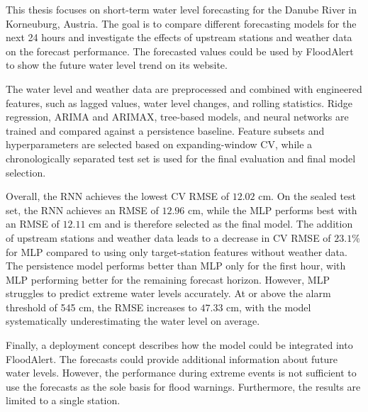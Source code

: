 This thesis focuses on short-term water level forecasting for the Danube River in Korneuburg, Austria. The goal is to compare different forecasting models for the next 24 hours and investigate the effects of upstream stations and weather data on the forecast performance. The forecasted values could be used by FloodAlert to show the future water level trend on its website.

The water level and weather data are preprocessed and combined with engineered features, such as lagged values, water level changes, and rolling statistics. Ridge regression, \ac{ARIMA} and \ac{ARIMAX}, tree-based models, and neural networks are trained and compared against a persistence baseline. Feature subsets and hyperparameters are selected based on expanding-window \ac{CV}, while a chronologically separated test set is used for the final evaluation and final model selection.

Overall, the \ac{RNN} achieves the lowest \ac{CV} \ac{RMSE} of $12.02$ cm. On the sealed test set, the \ac{RNN} achieves an \ac{RMSE} of $12.96$ cm, while the \ac{MLP} performs best with an \ac{RMSE} of $12.11$ cm and is therefore selected as the final model. The addition of upstream stations and weather data leads to a decrease in \ac{CV} \ac{RMSE} of $23.1\%$ for \ac{MLP} compared to using only target-station features without weather data. The persistence model performs better than \ac{MLP} only for the first hour, with \ac{MLP} performing better for the remaining forecast horizon. However, \ac{MLP} struggles to predict extreme water levels accurately. At or above the alarm threshold of 545 cm, the \ac{RMSE} increases to $47.33$ cm, with the model systematically underestimating the water level on average.

Finally, a deployment concept describes how the model could be integrated into FloodAlert. The forecasts could provide additional information about future water levels. However, the performance during extreme events is not sufficient to use the forecasts as the sole basis for flood warnings. Furthermore, the results are limited to a single station.
